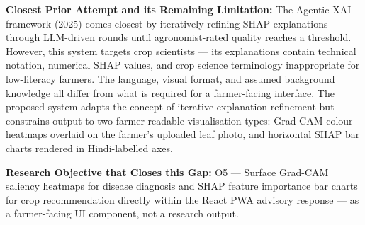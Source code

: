 \documentclass[12pt,a4paper]{article}
\begin{document}
\noindent\textbf{Closest Prior Attempt and its Remaining Limitation:}
The Agentic XAI framework (2025) comes closest by iteratively refining SHAP explanations through LLM-driven rounds until agronomist-rated quality reaches a threshold. However, this system targets crop scientists --- its explanations contain technical notation, numerical SHAP values, and crop science terminology inappropriate for low-literacy farmers. The language, visual format, and assumed background knowledge all differ from what is required for a farmer-facing interface. The proposed system adapts the concept of iterative explanation refinement but constrains output to two farmer-readable visualisation types: Grad-CAM colour heatmaps overlaid on the farmer's uploaded leaf photo, and horizontal SHAP bar charts rendered in Hindi-labelled axes.

\noindent\textbf{Research Objective that Closes this Gap:}
O5 --- Surface Grad-CAM saliency heatmaps for disease diagnosis and SHAP feature importance bar charts for crop recommendation directly within the React PWA advisory response --- as a farmer-facing UI component, not a research output.
\end{document}
